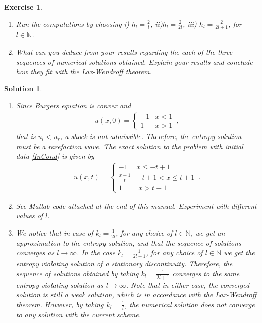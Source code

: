 \documentclass[10pt,letterpaper]{article}
\theoremstyle{break}
\newtheorem{exercise}{Exercise}
\newtheorem{mysolution}{Solution}
\newenvironment{solution}{\begin{mysolution}}{\end{mysolution}}
\begin{document}
\begin{exercise}
\begin{enumerate}
        \item Run the computations by choosing i) $h_l = \frac{2}{l}$, ii)$h_l = \frac{2}{2 l}$, iii) $h_l = \frac{2}{2 l + 1}$, for $l\in\mathbb{N}$.

        \item
        What can you deduce from your results regarding the each of the three sequences of numerical solutions obtained.
        Explain your results and conclude how they fit with the Lax-Wendroff theorem.
    \end{enumerate}
\end{exercise}

\begin{solution} \label{exLWTNonConvSeq}
    \begin{enumerate}
    \item
    Since Burgers equation is convex and
    \begin{gather} \label{InCond}
        u(x,0)=\begin{cases}
            -1 & x<1\\
            1 & x>1
        \end{cases}\ ,
    \end{gather}
    that is $u_l<u_r$, a shock is not admissible.
    Therefore, the entropy solution must be a rarefaction wave.
    The exact solution to the problem with initial data \eqref{InCond} is given by
    \begin{gather}
        u(x,t)=\begin{cases}
            -1 & x\leq-t+1\\
            \frac{x-1}{t} & -t+1<x\leq t+1\\
            1 & \; x>t+1
        \end{cases}\ .
    \end{gather}

    \item[(b),(c)]
    \addtocounter{enumii}{2}
    See Matlab code attached at the end of this manual. Experiment with different values of $l$.

    \item
    We notice that in case of $k_{l}=\frac{1}{2l}$, for any choice
    of $l\in\mathbb{N}$, we get an approximation to the entropy solution,
    and that the sequence of solutions converges as $l\rightarrow\infty$.
    In the case $k_{l}=\frac{1}{2l+1}$, for any choice of $l\in\mathbb{N}$ we get the entropy violating solution of a stationary discontinuity.
    Therefore, the sequence of solutions obtained by taking $k_{l}=\frac{1}{2l+1}$ converges to the same entropy violating solution as $l\rightarrow\infty$.
    Note that in either case, the converged solution is still a weak solution, which is in accordance with the Lax-Wendroff theorem. However, by taking $k_{l}=\frac{1}{l}$, the numerical solution does not converge to any solution with the current scheme.
    \end{enumerate}
\end{solution}
\end{document}
